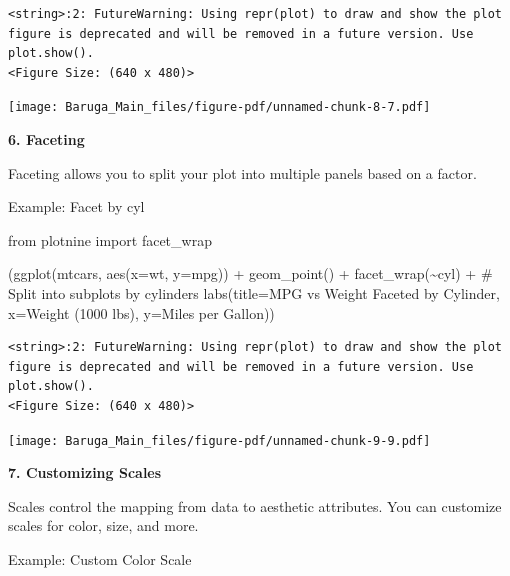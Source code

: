 \documentclass[
  letterpaper,
  DIV=11,
  numbers=noendperiod]{scrreprt}
\newenvironment{Shaded}{\begin{snugshade}}{\end{snugshade}}
\newcommand{\CommentTok}[1]{\textcolor[rgb]{0.37,0.37,0.37}{#1}}
\newcommand{\ImportTok}[1]{\textcolor[rgb]{0.00,0.46,0.62}{#1}}
\newcommand{\NormalTok}[1]{\textcolor[rgb]{0.00,0.23,0.31}{#1}}
\newcommand{\OperatorTok}[1]{\textcolor[rgb]{0.37,0.37,0.37}{#1}}
\newcommand{\StringTok}[1]{\textcolor[rgb]{0.13,0.47,0.30}{#1}}
\begin{document}
\begin{verbatim}
<string>:2: FutureWarning: Using repr(plot) to draw and show the plot figure is deprecated and will be removed in a future version. Use plot.show().
<Figure Size: (640 x 480)>
\end{verbatim}

\texttt{[image: Baruga\_Main\_files/figure-pdf/unnamed-chunk-8-7.pdf]}

\textbf{6. Faceting}

Faceting allows you to split your plot into multiple panels based on a
factor.

Example: Facet by cyl

\begin{Shaded}
\begin{Highlighting}[]
\ImportTok{from}\NormalTok{ plotnine }\ImportTok{import}\NormalTok{ facet\_wrap}

\NormalTok{(ggplot(mtcars, aes(x}\OperatorTok{=}\StringTok{\textquotesingle{}wt\textquotesingle{}}\NormalTok{, y}\OperatorTok{=}\StringTok{\textquotesingle{}mpg\textquotesingle{}}\NormalTok{)) }\OperatorTok{+}
\NormalTok{ geom\_point() }\OperatorTok{+}
\NormalTok{ facet\_wrap(}\StringTok{\textquotesingle{}\textasciitilde{}cyl\textquotesingle{}}\NormalTok{) }\OperatorTok{+}  \CommentTok{\# Split into subplots by cylinders}
\NormalTok{ labs(title}\OperatorTok{=}\StringTok{\textquotesingle{}MPG vs Weight Faceted by Cylinder\textquotesingle{}}\NormalTok{,}
\NormalTok{      x}\OperatorTok{=}\StringTok{\textquotesingle{}Weight (1000 lbs)\textquotesingle{}}\NormalTok{,}
\NormalTok{      y}\OperatorTok{=}\StringTok{\textquotesingle{}Miles per Gallon\textquotesingle{}}\NormalTok{))}
\end{Highlighting}
\end{Shaded}

\begin{verbatim}
<string>:2: FutureWarning: Using repr(plot) to draw and show the plot figure is deprecated and will be removed in a future version. Use plot.show().
<Figure Size: (640 x 480)>
\end{verbatim}

\texttt{[image: Baruga\_Main\_files/figure-pdf/unnamed-chunk-9-9.pdf]}

\textbf{7. Customizing Scales}

Scales control the mapping from data to aesthetic attributes. You can
customize scales for color, size, and more.

Example: Custom Color Scale
\end{document}
